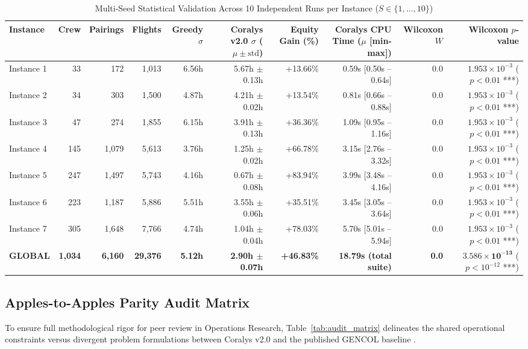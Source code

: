 \documentclass[journal]{IEEEtran}
\begin{document}
\begin{table}[t]
\caption{Multi-Seed Statistical Validation Across 10 Independent Runs per Instance ($S \in \{1, \dots, 10\}$)}
\label{tab:multiseed}
\centering
\begin{tabular}{lrrrrrrrrr}
\toprule
Instance & Crew & Pairings & Flights & Greedy $\sigma$ & Coralys v2.0 $\sigma$ ($\mu \pm \text{std}$) & Equity Gain (\%) & Coralys CPU Time ($\mu$ [min-max]) & Wilcoxon $W$ & Wilcoxon $p$-value \\
\midrule
Instance 1 & 33 & 172 & 1,013 & 6.56h & 5.67h $\pm$ 0.13h & +13.66\% & 0.59s [0.50s -- 0.64s] & 0.0 & $1.953 \times 10^{-3}$ ($p < 0.01$ ***) \\
Instance 2 & 34 & 303 & 1,500 & 4.87h & 4.21h $\pm$ 0.02h & +13.54\% & 0.81s [0.66s -- 0.88s] & 0.0 & $1.953 \times 10^{-3}$ ($p < 0.01$ ***) \\
Instance 3 & 47 & 274 & 1,855 & 6.15h & 3.91h $\pm$ 0.13h & +36.36\% & 1.09s [0.95s -- 1.16s] & 0.0 & $1.953 \times 10^{-3}$ ($p < 0.01$ ***) \\
Instance 4 & 145 & 1,079 & 5,613 & 3.76h & 1.25h $\pm$ 0.02h & +66.78\% & 3.15s [2.76s -- 3.32s] & 0.0 & $1.953 \times 10^{-3}$ ($p < 0.01$ ***) \\
Instance 5 & 247 & 1,497 & 5,743 & 4.16h & 0.67h $\pm$ 0.08h & +83.94\% & 3.99s [3.48s -- 4.16s] & 0.0 & $1.953 \times 10^{-3}$ ($p < 0.01$ ***) \\
Instance 6 & 223 & 1,187 & 5,886 & 5.51h & 3.55h $\pm$ 0.06h & +35.51\% & 3.45s [3.05s -- 3.64s] & 0.0 & $1.953 \times 10^{-3}$ ($p < 0.01$ ***) \\
Instance 7 & 305 & 1,648 & 7,766 & 4.74h & 1.04h $\pm$ 0.04h & +78.03\% & 5.70s [5.01s -- 5.94s] & 0.0 & $1.953 \times 10^{-3}$ ($p < 0.01$ ***) \\
\midrule
\textbf{GLOBAL} & \textbf{1,034} & \textbf{6,160} & \textbf{29,376} & \textbf{5.12h} & \textbf{2.90h $\pm$ 0.07h} & \textbf{+46.83\%} & \textbf{18.79s (total suite)} & \textbf{0.0} & $\mathbf{3.586 \times 10^{-13}}$ ($p < 10^{-12}$ ***) \\
\bottomrule
\end{tabular}
\end{table}

\subsection{Apples-to-Apples Parity Audit Matrix}

To ensure full methodological rigor for peer review in Operations Research, Table~\ref{tab:audit_matrix} delineates the shared operational constraints versus divergent problem formulations between Coralys v2.0 and the published GENCOL baseline \cite{kasirzadeh2017}.
\end{document}
